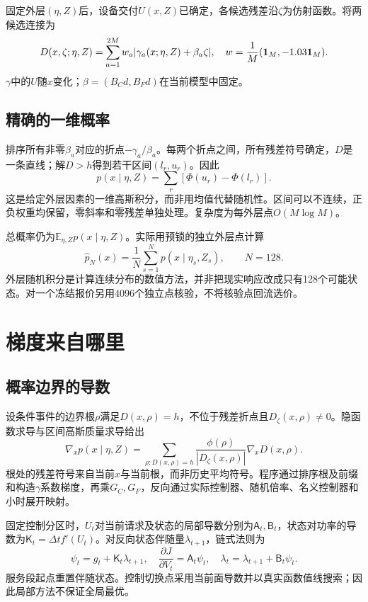 \documentclass[UTF8,a4paper,11pt]{ctexart}
\newcommand{\E}{\mathbb E}\newcommand{\Prb}{\mathbb P}\newcommand{\R}{\mathbb R}
\begin{document}
固定外层$(\eta,Z)$后，设备交付$U(x,Z)$已确定，各候选残差沿$\zeta$为仿射函数。将两候选连接为
\begin{equation}
 D(x,\zeta;\eta,Z)=\sum_{a=1}^{2M}w_a|\gamma_a(x;\eta,Z)+\beta_a\zeta|,
 \quad w=\frac1M(\mathbf 1_M,-1.03\mathbf 1_M).
\end{equation}
$\gamma$中的$U$随$x$变化；$\beta=(B_Cd,B_Fd)$在当前模型中固定。

\subsection{精确的一维概率}
排序所有非零$\beta_a$对应的折点$-\gamma_a/\beta_a$。每两个折点之间，所有残差符号确定，$D$是一条直线；解$D>h$得到若干区间$(l_r,u_r)$。因此
\begin{equation}
 p(x\mid\eta,Z)=\sum_r[\Phi(u_r)-\Phi(l_r)].\label{eq:integration}
\end{equation}
这是给定外层因素的一维高斯积分，而非用均值代替随机性。区间可以不连续，正负权重均保留，零斜率和零残差单独处理。复杂度为每外层点$O(M\log M)$。

总概率仍为$\E_{\eta,Z}p(x\mid\eta,Z)$。实际用预锁的独立外层点计算
\begin{equation}
 \widehat p_N(x)=\frac1N\sum_{s=1}^N p(x\mid\eta_s,Z_s),\qquad N=128.
\end{equation}
外层随机积分是计算连续分布的数值方法，并非把现实响应改成只有128个可能状态。对一个冻结报价另用4096个独立点核验，不将核验点回流选价。

\section{梯度来自哪里}
\subsection{概率边界的导数}
设条件事件的边界根$\rho$满足$D(x,\rho)=h$，不位于残差折点且$D_\zeta(x,\rho)\ne0$。隐函数求导与区间高斯质量求导给出
\begin{equation}
 \nabla_x p(x\mid\eta,Z)=\sum_{\rho:D(x,\rho)=h}
 \frac{\phi(\rho)}{|D_\zeta(x,\rho)|}\nabla_xD(x,\rho).\label{eq:gradient}
\end{equation}
根处的残差符号来自当前$x$与当前根，而非历史平均符号。程序通过排序根及前缀和构造$\gamma$系数梯度，再乘$G_C,G_F$，反向通过实际控制器、随机倍率、名义控制器和小时展开映射。

固定控制分区时，$U_t$对当前请求及状态的局部导数分别为$\mathsf A_t,\mathsf B_t$，状态对功率的导数为$\mathsf K_t=\Delta tf'(U_t)$。对反向状态伴随量$\lambda_{t+1}$，链式法则为
\begin{equation}
 \psi_t=g_t+\mathsf K_t\lambda_{t+1},\quad
 \frac{\partial J}{\partial V_t}=\mathsf A_t\psi_t,\quad
 \lambda_t=\lambda_{t+1}+\mathsf B_t\psi_t.
\end{equation}
服务段起点重置伴随状态。控制切换点采用当前面导数并以真实函数值线搜索；因此局部方法不保证全局最优。
\end{document}
